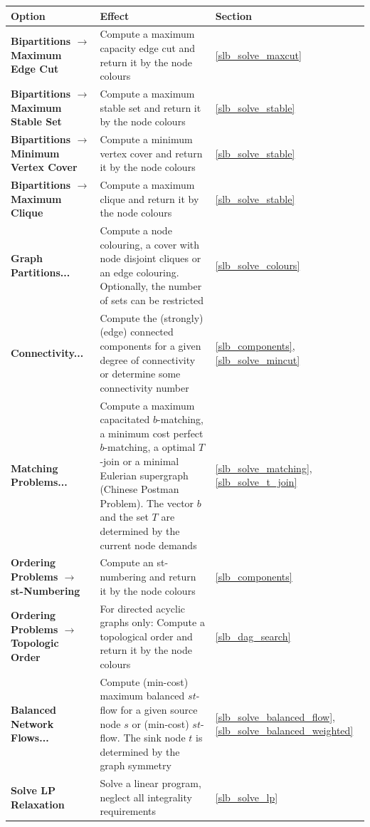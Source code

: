 \documentclass[a4paper,11pt,twoside]{book}
\begin{document}
\vfill
\bigskip
\noindent
\begin{tabular}{p{7.5cm}|p{15.8cm}|p{1.5cm}} 
\large\bf Option & \large\bf Effect & \large\bf Section \\
[1mm] \hline \hline
\bf  Bipartitions $\rightarrow$ Maximum Edge Cut &
     Compute a maximum capacity edge cut and return it by the node colours &
     \ref{slb_solve_maxcut} \\ \hline
\bf  Bipartitions $\rightarrow$ Maximum Stable Set &
     Compute a maximum stable set and return it by the node colours &
     \ref{slb_solve_stable} \\ \hline
\bf  Bipartitions $\rightarrow$ Minimum Vertex Cover &
     Compute a minimum vertex cover and return it by the node colours &
     \ref{slb_solve_stable} \\ \hline
\bf  Bipartitions $\rightarrow$ Maximum Clique &
     Compute a maximum clique and return it by the node colours &
     \ref{slb_solve_stable} \\ \hline
\bf  Graph Partitions... &
     Compute a node colouring, a cover with node disjoint cliques or an edge
     colouring. Optionally, the number of sets can be restricted &
     \ref{slb_solve_colours} \\ \hline
\bf  Connectivity... &
     Compute the (strongly) (edge) connected components for a given degree
     of connectivity or determine some connectivity number &
     \ref{slb_components}, \ref{slb_solve_mincut} \\ \hline
\bf  Matching Problems... &
     Compute a maximum capacitated $b$-matching, a minimum cost perfect
     $b$-matching, a optimal $T$-join or a minimal Eulerian supergraph
     (Chinese Postman Problem). The vector $b$ and the set $T$ are determined
     by the current node demands &
     \ref{slb_solve_matching}, \ref{slb_solve_t_join} \\ \hline
\bf  Ordering Problems $\rightarrow$ st-Numbering &
     Compute an st-numbering and return it by the node colours &
     \ref{slb_components} \\ \hline
\bf  Ordering Problems $\rightarrow$ Topologic Order &
     For directed acyclic graphs only: Compute a topological order and return
     it by the node colours &
     \ref{slb_dag_search} \\ \hline
\bf  Balanced Network Flows... &
     Compute (min-cost) maximum balanced $st$-flow for a given source node $s$
     or (min-cost) $st$-flow. The sink node $t$ is determined by the graph
     symmetry &
     \ref{slb_solve_balanced_flow}, \ref{slb_solve_balanced_weighted} \\ \hline
\bf  Solve LP Relaxation &
     Solve a linear program, neglect all integrality requirements &
     \ref{slb_solve_lp}
\end{tabular}
\end{document}
